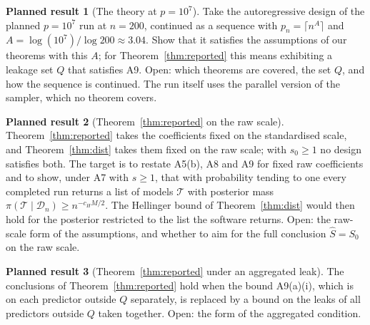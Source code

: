 \documentclass[11pt]{article}
\newcommand{\Sz}{S_0}
\newcommand{\sz}{s_0}
\newcommand{\Shat}{\hat S}
\newcommand{\Dn}{\mathcal D_n}
\theoremstyle{plain}
\theoremstyle{definition}
\newtheorem{planned}{Planned result}
\begin{document}
\begin{planned}[The theory at $p=10^7$]
Take the autoregressive design of the planned $p=10^7$ run at $n=200$, continued as a sequence with $p_n=\lceil
n^{A}\rceil$ and $A=\log(10^7)/\log200\approx3.04$. Show that it satisfies the assumptions of our theorems with this
$A$; for Theorem~\ref{thm:reported} this means exhibiting a leakage set $Q$ that satisfies A9. Open: which theorems
are covered, the set $Q$, and how the sequence is continued. The run itself uses the parallel version of the sampler,
which no theorem covers.
\end{planned}

\begin{planned}[Theorem~\ref{thm:reported} on the raw scale]
Theorem~\ref{thm:reported} takes the coefficients fixed on the standardised scale, and Theorem~\ref{thm:dist} takes
them fixed on the raw scale; with $\sz\ge1$ no design satisfies both. The target is to restate A5(b), A8 and A9 for
fixed raw coefficients and to show, under A7 with $s\ge1$, that with probability tending to one every completed run
returns a list of models $\mathcal T$ with posterior mass $\pi(\mathcal T\mid\Dn)\ge n^{-c_HM/2}$. The Hellinger bound
of Theorem~\ref{thm:dist} would then hold for the posterior restricted to the list the software returns. Open: the
raw-scale form of the assumptions, and whether to aim for the full conclusion $\Shat=\Sz$ on the raw scale.
\end{planned}

\begin{planned}[Theorem~\ref{thm:reported} under an aggregated leak]
The conclusions of Theorem~\ref{thm:reported} hold when the bound A9(a)(i), which is on each predictor outside $Q$
separately, is replaced by a bound on the leaks of all predictors outside $Q$ taken together. Open: the form of the
aggregated condition.
\end{planned}
\end{document}
